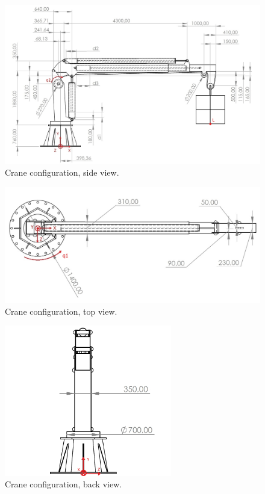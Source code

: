 \documentclass{article}
\begin{document}
	\begin{figure}[h!]
		\centering
		\includegraphics[width=\textwidth]{kran_bokocrt.jpg}
		\caption{Crane configuration, side view.}
		\label{fig:crane_side}
	\end{figure}
	
	\begin{figure}[h!]
		\centering
		\includegraphics[width=\textwidth]{kran_tlocrt.jpg}
		\caption{Crane configuration, top view.}
		\label{fig:crane_top}
	\end{figure}
	
	\begin{figure}[h!]
		\centering
		\includegraphics[width=0.65\textwidth]{kran_nacrt.jpg}
		\caption{Crane configuration, back view.}
		\label{fig:crane_back}
	\end{figure}
	
\end{document}
